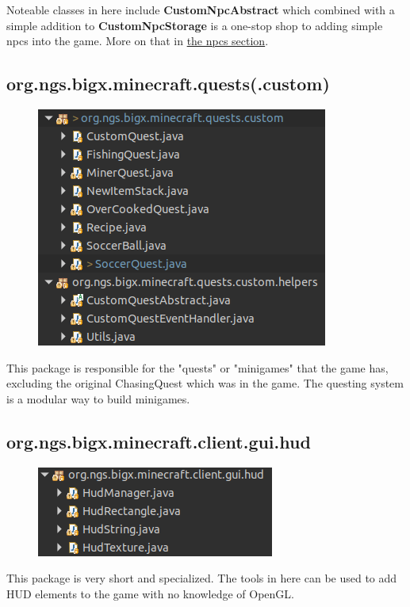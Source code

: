 \documentclass[12pt]{article}
\begin{document}
Noteable classes in here include {\bfseries CustomNpcAbstract} which combined with a simple addition to {\bfseries CustomNpcStorage} is a one-stop shop to adding simple npcs into the game. More on that in \hyperref[sec:npcs]{the npcs section}.

\subsection{org.ngs.bigx.minecraft.quests(.custom)}
\begin{figure}[H]
	\includegraphics[scale=0.5]{images/tour/orgNgsBigxMinecraftQuestsCustom.png}
	\centering
\end{figure}

This package is responsible for the "quests" or "minigames" that the game has, excluding the original ChasingQuest which was in the game. The questing system is a modular way to build minigames.

\subsection{org.ngs.bigx.minecraft.client.gui.hud}
\begin{figure}[H]
	\includegraphics[scale=0.5]{images/tour/orgNgsBigxMinecraftClientGuiHud.png}
	\centering
\end{figure}

This package is very short and specialized. The tools in here can be used to add HUD elements to the game with no knowledge of OpenGL.
\end{document}
